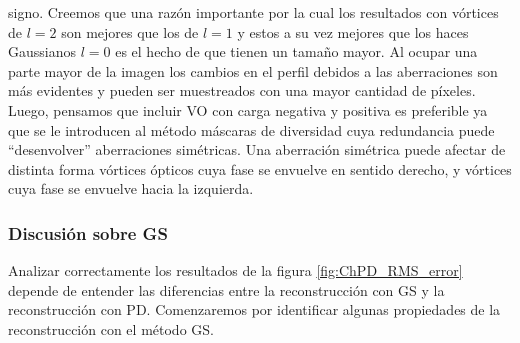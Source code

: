 signo. Creemos que una razón importante por la cual los resultados con
vórtices de $l=2$ son mejores que los de $l=1$ y estos a su vez
mejores que los haces Gaussianos $l=0$ es el hecho de que tienen un
tamaño mayor. Al ocupar una parte mayor de la imagen los cambios en el
perfil debidos a las aberraciones son más evidentes y pueden ser
muestreados con una mayor cantidad de píxeles. Luego, pensamos que
incluir VO con carga negativa y positiva es preferible ya que se le
introducen al método máscaras de diversidad cuya redundancia puede ``desenvolver''
aberraciones simétricas. Una aberración simétrica puede afectar de
distinta forma vórtices ópticos cuya fase se envuelve en sentido
derecho, y vórtices cuya fase se envuelve hacia la izquierda.\\

\subsubsection{Discusión sobre GS}
Analizar correctamente los resultados de la figura
\ref{fig:ChPD_RMS_error} depende de entender las diferencias entre la
reconstrucción con GS y la reconstrucción con PD. Comenzaremos por
identificar algunas propiedades de la reconstrucción con el método GS.

